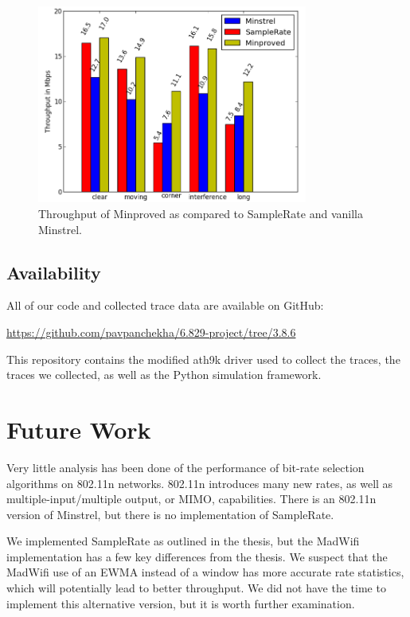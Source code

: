 \documentclass[letterpaper,twocolumn,10pt]{article}
\begin{document}
\begin{figure}[htb]
  \hspace{-2em}\includegraphics[width=3.5in]{mnVSspVSmp1.png}\vspace{-0em}
  \caption{Throughput of Minproved as compared to SampleRate and vanilla Minstrel.}
\label{figure:4}
\end{figure}


\subsection{Availability}
All of our code and collected trace data are available on GitHub:

\noindent
{\small\url{https://github.com/pavpanchekha/6.829-project/tree/3.8.6}}

This repository contains the modified ath9k driver used to collect the
traces, the traces we collected, as well as the Python simulation
framework.

\section{Future Work}

Very little analysis has been done of the performance of bit-rate
selection algorithms on 802.11n networks. 802.11n introduces many new
rates, as well as multiple-input/multiple output, or MIMO,
capabilities. There is an 802.11n version of Minstrel, but there is no
implementation of SampleRate.

We implemented SampleRate as outlined in the thesis, but the MadWifi
implementation has a few key differences from the thesis. We suspect
that the MadWifi use of an EWMA instead of a window has more accurate
rate statistics, which will potentially lead to better throughput. We
did not have the time to implement this alternative version, but it is
worth further examination.
\end{document}
